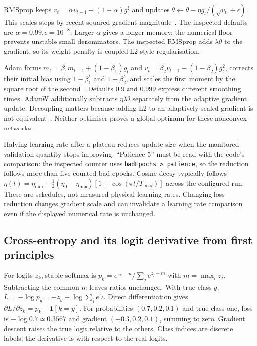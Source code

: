 RMSprop keeps $v_t=\alpha v_{t-1}+(1-\alpha)g_t^2$ and updates
$\theta\leftarrow\theta-\eta g_t/(\sqrt{v_t}+\epsilon)$.
This scales steps by recent squared-gradient magnitude~\cite{rmslecture}.
The inspected defaults are $\alpha=0.99,\epsilon=10^{-8}$. Larger
$\alpha$ gives a longer memory; the numerical floor prevents unstable small
denominators. The inspected RMSprop adds $\lambda\theta$ to the gradient,
so its weight penalty is coupled L2-style regularisation.

Adam forms $m_t=\beta_1m_{t-1}+(1-\beta_1)g_t$ and
$v_t=\beta_2v_{t-1}+(1-\beta_2)g_t^2$, corrects their initial bias using
$1-\beta_1^t$ and $1-\beta_2^t$, and scales the first moment by the square
root of the second~\cite{kingma2015}. Defaults 0.9 and 0.999 express
different smoothing times. AdamW additionally subtracts
$\eta\lambda\theta$ separately from the adaptive gradient update.
Decoupling matters because adding L2 to an adaptively scaled gradient is
not equivalent~\cite{loshchilov2019}. Neither optimiser proves a global
optimum for these nonconvex networks.

Halving learning rate after a plateau reduces update size when the monitored
validation quantity stops improving. ``Patience 5'' must be read with the
code's comparison: the inspected counter uses \texttt{badEpochs > patience},
so the reduction follows more than five counted bad epochs. Cosine decay
typically follows $\eta(t)=\eta_{\min}+
\tfrac12(\eta_0-\eta_{\min})[1+\cos(\pi t/T_{\max})]$ across the
configured run. These are schedules, not measured physical learning rates.
Changing loss reduction changes gradient scale and can invalidate a learning
rate comparison even if the displayed numerical rate is unchanged.

\subsection{Cross-entropy and its logit derivative from first principles}
For logits $z_k$, stable softmax is
$p_k=e^{z_k-m}/\sum_j e^{z_j-m}$ with $m=\max_jz_j$.
Subtracting the common $m$ leaves ratios unchanged. With true class $y$,
$L=-\log p_y=-z_y+\log\sum_j e^{z_j}$.
Direct differentiation gives
$\partial L/\partial z_k=p_k-\mathbf1[k=y]$.
For probabilities $(0.7,0.2,0.1)$ and true class one, loss is
$-\log0.7\simeq0.3567$ and gradient $(-0.3,0.2,0.1)$, summing to zero.
Gradient descent raises the true logit relative to the others. Class indices
are discrete labels; the derivative is with respect to the real logits.

